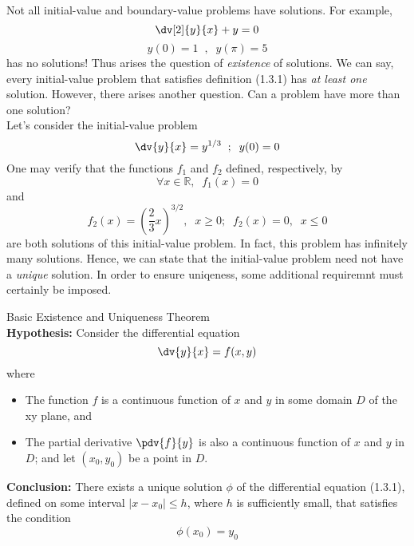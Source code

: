 Not all initial-value and boundary-value problems have solutions. For example,\[
    \dv[2]{y}{x} + y = 0
\] \[ y(0) = 1 \;\;,\;\; y(\pi) = 5 \]
has no solutions! Thus arises the question of \textit{existence} of solutions. We can say, every initial-value problem that satisfies definition (1.3.1) has \textit{at least one} solution. However, there arises another question. Can a problem have more than one solution? \\
Let's consider the initial-value problem
\[ \dv{y}{x} = y^{1/3} \;\;;\;\;y(0) = 0 \]
One may verify that the functions $f_1$ and $f_2$ defined, respectively, by \[
    \forall x\in \mathbb{R} ,\;\; f_1(x) = 0
\] and \[
    f_2(x) = (\frac{2}{3}x)^{3/2}, \;\; x \ge 0; \;\; f_2(x) = 0, \;\; x \le 0
\] are both solutions of this initial-value problem. In fact, this problem has infinitely many solutions. Hence, we can state that the initial-value problem need not have a \textit{unique} solution. In order to ensure uniqeness, some additional requiremnt must certainly be imposed.

\begin{theorem}{Basic Existence and Uniqueness Theorem}{}
    \\\textbf{Hypothesis: }
    Consider the differential equation
    \begin{equation}
        \dv{y}{x} = f(x,y)
    \end{equation}
    where
    \begin{itemize}
        \item The function $f$ is a continuous function of $x$ and $y$ in some domain $D$ of the xy plane, and
        \item The partial derivative $\pdv{f}{y}$ is also a continuous function of $x$ and $y$ in $D$; and let $(x_0,y_0)$ be a point in $D$.
    \end{itemize}

    \textbf{Conclusion: }
    There exists a unique solution $\phi$ of the differential equation (1.3.1), defined on some interval $|x-x_0| \le h$, where $h$ is sufficiently small, that satisfies the condition
    \[
        \phi(x_0) = y_0
    \]
\end{theorem}

